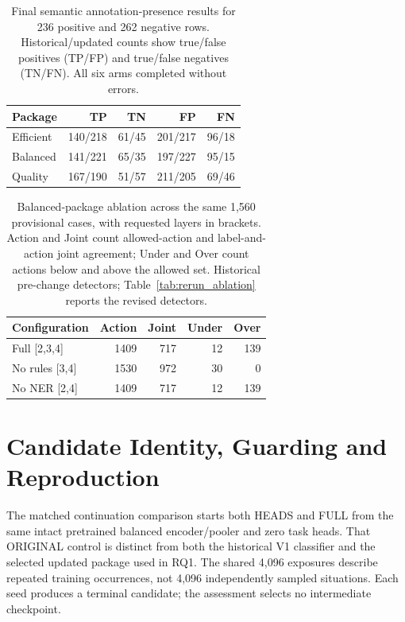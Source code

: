 \documentclass[sigconf]{acmart}
\theoremstyle{acmdefinition}\newtheorem{property}{Property}
\begin{document}
\begin{table}[!t]
\centering
\caption{Final semantic annotation-presence results for 236 positive and 262 negative rows. Historical/updated counts show true/false positives (TP/FP) and true/false negatives (TN/FN). All six arms completed without errors.}
\label{tab:final_presence}
\small
\begin{tabular}{lrrrr}
\toprule
Package & TP & TN & FP & FN \\
\midrule
Efficient &140/218 &61/45 &201/217 &96/18 \\
Balanced &141/221 &65/35 &197/227 &95/15 \\
Quality &167/190 &51/57 &211/205 &69/46 \\
\bottomrule
\end{tabular}
\end{table}

\begin{table}[!t]
\centering
\caption{Balanced-package ablation across the same 1,560 provisional cases, with requested layers in brackets. Action and Joint count allowed-action and label-and-action joint agreement; Under and Over count actions below and above the allowed set. Historical pre-change detectors; Table~\ref{tab:rerun_ablation} reports the revised detectors.}
\label{tab:targeted_ablation}
\small
\begin{tabular}{lrrrr}
\toprule
Configuration & Action & Joint & Under & Over \\
\midrule
Full [2,3,4] &1409 &717 &12 &139 \\
No rules [3,4] &1530 &972 &30 &0 \\
No NER [2,4] &1409 &717 &12 &139 \\
\bottomrule
\end{tabular}
\end{table}

\section{Candidate Identity, Guarding and Reproduction}
\label{app:retention}
The matched continuation comparison starts both HEADS and FULL from the same intact pretrained balanced encoder/pooler and zero task heads. That ORIGINAL control is distinct from both the historical V1 classifier and the selected updated package used in RQ1. The shared 4,096 exposures describe repeated training occurrences, not 4,096 independently sampled situations. Each seed produces a terminal candidate; the assessment selects no intermediate checkpoint.
\end{document}
